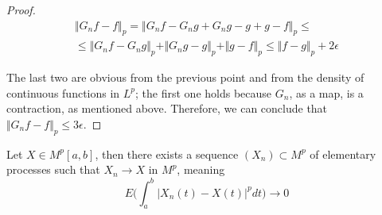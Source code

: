 \begin{proof}
\begin{gather*}
    \Vert G_n f - f \Vert_p = \Vert G_n f - G_n g + G_n g - g + g - f \Vert_p \leq \\
    \leq \Vert G_n f - G_n g \Vert_p + \Vert G_n g - g \Vert_p + \Vert g - f \Vert_p \leq \Vert f - g \Vert_p + 2\epsilon
\end{gather*}

The last two are obvious from the previous point and from the density of continuous functions in $L^p$; the first one holds because $G_n$, as a map, is a contraction, as mentioned above. Therefore, we can conclude that $\Vert G_n f - f \Vert_p \leq 3\epsilon$. 

\end{proof}

\begin{lemma}
    Let $X \in M^p[a,b]$, then there exists a sequence $(X_n) \subset M^p$ of elementary processes such that $X_n \to X$ in $M^p$, meaning 
    \begin{equation*}
        E\Bigg( \int_a^b \Big\vert X_n(t) - X(t) \Big\vert^p dt \Bigg) \to 0 
    \end{equation*}
\end{lemma}
